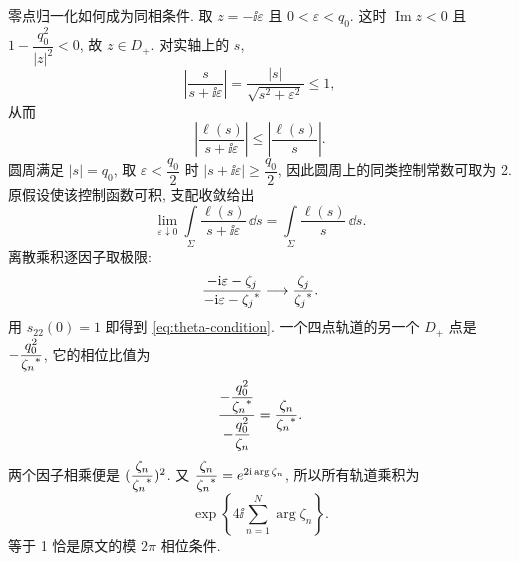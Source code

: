 \par\smallskip\noindent 零点归一化如何成为同相条件.\quad
取 $z=-\ii\varepsilon$ 且 $0<\varepsilon<q_0$.
这时 $\operatorname{Im}z<0$ 且 $1-\dfrac{q_0^2}{|z|^2}<0$,
故 $z\in D_+$.
对实轴上的 $s$,
\begin{equation*}
\left|\dfrac{s}{s+\ii\varepsilon}\right|
=\dfrac{|s|}{\sqrt{s^2+\varepsilon^2}}\le1,
\end{equation*}
从而
\begin{equation*}
\left|\dfrac{\ell(s)}{s+\ii\varepsilon}\right|
\le\left|\dfrac{\ell(s)}{s}\right|.
\end{equation*}
圆周满足 $|s|=q_0$, 取 $\varepsilon<\dfrac{q_0}{2}$ 时
$|s+\ii\varepsilon|\ge\dfrac{q_0}{2}$,
因此圆周上的同类控制常数可取为 2.
原假设使该控制函数可积, 支配收敛给出
\begin{equation*}
\lim\limits_{\varepsilon\downarrow0}
\int\limits_\Sigma\dfrac{\ell(s)}{s+\ii\varepsilon}\,\dd s
=\int\limits_\Sigma\dfrac{\ell(s)}{s}\,\dd s.
\end{equation*}
离散乘积逐因子取极限:
\begin{equation*}
\dfrac{-\mathrm{i}\varepsilon-\zeta_j}
{-\mathrm{i}\varepsilon-{\zeta_j}^{*}}
\longrightarrow\dfrac{\zeta_j}{{\zeta_j}^{*}}.
\end{equation*}
用 $s_{22}(0)=1$ 即得到 \eqref{eq:theta-condition}.
一个四点轨道的另一个 $D_+$ 点是
$-\dfrac{q_0^2}{{\zeta_n}^{*}}$, 它的相位比值为
\begin{equation*}
\dfrac{-\dfrac{q_0^2}{{\zeta_n}^{*}}}{-\dfrac{q_0^2}{\zeta_n}}
=\dfrac{\zeta_n}{{\zeta_n}^{*}}.
\end{equation*}
两个因子相乘便是 $(\dfrac{\zeta_n}{{\zeta_n}^{*}})^2$.
又 $\dfrac{\zeta_n}{{\zeta_n}^{*}}=e^{2\mathrm{i}\arg\zeta_n}$,
所以所有轨道乘积为
\begin{equation*}
\exp\left\{4\ii\sum\limits_{n=1}^{N}\arg\zeta_n\right\}.
\end{equation*}
等于 1 恰是原文的模 $2\pi$ 相位条件.
